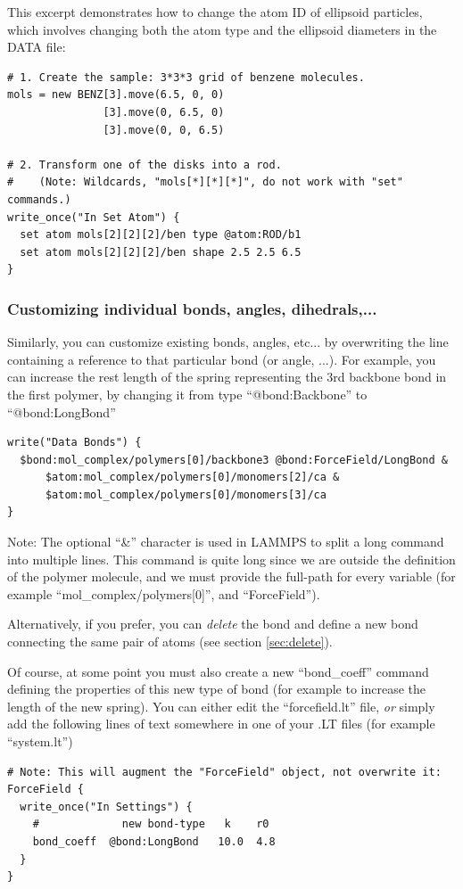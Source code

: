\documentclass[11pt]{article}
\begin{document}
This excerpt demonstrates how to change the atom ID of ellipsoid particles, which involves changing both the atom type and the ellipsoid diameters in the DATA file:
\begin{verbatim}
# 1. Create the sample: 3*3*3 grid of benzene molecules.
mols = new BENZ[3].move(6.5, 0, 0)
               [3].move(0, 6.5, 0)
               [3].move(0, 0, 6.5)

# 2. Transform one of the disks into a rod.
#    (Note: Wildcards, "mols[*][*][*]", do not work with "set" commands.)
write_once("In Set Atom") {
  set atom mols[2][2][2]/ben type @atom:ROD/b1
  set atom mols[2][2][2]/ben shape 2.5 2.5 6.5
}
\end{verbatim}



\subsubsection{Customizing individual bonds, angles, dihedrals,...}
\label{sec:custom_bond}
Similarly, you can customize existing bonds, angles, etc... by overwriting the
line containing a reference to that particular bond (or angle, ...).
For example, you can increase the rest length of the spring representing
the 3rd backbone bond in the first polymer, 
by changing it from type ``@bond:Backbone'' to ``@bond:LongBond''
\begin{verbatim}
write("Data Bonds") {
  $bond:mol_complex/polymers[0]/backbone3 @bond:ForceField/LongBond &
      $atom:mol_complex/polymers[0]/monomers[2]/ca &
      $atom:mol_complex/polymers[0]/monomers[3]/ca 
}
\end{verbatim}
Note: The optional ``\&'' character is used in LAMMPS to split a long command
into multiple lines.
This command is quite long since we are outside the definition
of the polymer molecule, and we must provide the full-path for every variable
(for example ``mol\_complex/polymers[0]'', and ``ForceField'').

Alternatively, if you prefer, you can \textit{delete} the bond 
and define a new bond connecting the same pair of atoms
(see section \ref{sec:delete}).

Of course, at some point you must also create a new ``bond\_coeff''
command defining the properties of this new type of bond
(for example to increase the length of the new spring).
You can either edit the ``forcefield.lt'' file,
\textit{or} simply add the following lines
of text somewhere in one of your .LT files (for example ``system.lt'')
\begin{verbatim}
# Note: This will augment the "ForceField" object, not overwrite it:
ForceField { 
  write_once("In Settings") {
    #             new bond-type   k    r0
    bond_coeff  @bond:LongBond   10.0  4.8
  }
}
\end{verbatim}
\end{document}
